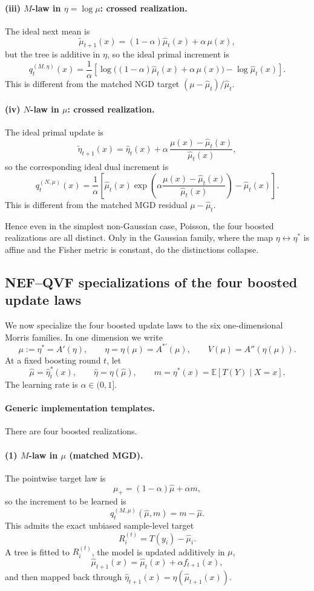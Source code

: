 \documentclass[11pt]{article}
\begin{document}
\paragraph{(iii) \(M\)-law in \(\eta=\log\mu\): crossed realization.}
The ideal next mean is
\[
\tilde\mu_{t+1}(x)=(1-\alpha)\hat\mu_t(x)+\alpha\,\mu(x),
\]
but the tree is additive in \(\eta\), so the ideal primal increment is
\[
q_t^{(M,\eta)}(x)
=
\frac{1}{\alpha}
\left[
\log\big((1-\alpha)\hat\mu_t(x)+\alpha\,\mu(x)\big)-\log \hat\mu_t(x)
\right].
\]
This is different from the matched NGD target \((\mu-\hat\mu_t)/\hat\mu_t\).

\paragraph{(iv) \(N\)-law in \(\mu\): crossed realization.}
The ideal primal update is
\[
\tilde\eta_{t+1}(x)
=
\hat\eta_t(x)+\alpha\,\frac{\mu(x)-\hat\mu_t(x)}{\hat\mu_t(x)},
\]
so the corresponding ideal dual increment is
\[
q_t^{(N,\mu)}(x)
=
\frac{1}{\alpha}
\left[
\hat\mu_t(x)\exp\!\left(
\alpha\frac{\mu(x)-\hat\mu_t(x)}{\hat\mu_t(x)}
\right)
-
\hat\mu_t(x)
\right].
\]
This is different from the matched MGD residual \(\mu-\hat\mu_t\).

Hence even in the simplest non-Gaussian case, Poisson, the four boosted realizations are all distinct. Only in the Gaussian family, where the map \(\eta\leftrightarrow\eta^\ast\) is affine and the Fisher metric is constant, do the distinctions collapse.

\subsection{NEF--QVF specializations of the four boosted update laws}

We now specialize the four boosted update laws to the six one-dimensional Morris families. In one dimension we write
\[
\mu:=\eta^\ast=A'(\eta),
\qquad
\eta=\eta(\mu)=A^{\ast\prime}(\mu),
\qquad
V(\mu)=A''(\eta(\mu)).
\]
At a fixed boosting round \(t\), let
\[
\hat\mu=\hat\eta_t^\ast(x),
\qquad
\hat\eta=\eta(\hat\mu),
\qquad
m=\eta^\ast(x)=\mathbb E[T(Y)\mid X=x].
\]
The learning rate is \(\alpha\in(0,1]\).

\paragraph{Generic implementation templates.}
There are four boosted realizations.

\paragraph{(1) \(M\)-law in \(\mu\) (matched MGD).}
The pointwise target law is
\[
\mu_{+}=(1-\alpha)\hat\mu+\alpha m,
\]
so the increment to be learned is
\[
q_t^{(M,\mu)}(\hat\mu,m)=m-\hat\mu.
\]
This admits the exact unbiased sample-level target
\[
R_i^{(t)}=T(y_i)-\hat\mu_i.
\]
A tree is fitted to \(R_i^{(t)}\), the model is updated additively in \(\mu\),
\[
\hat\mu_{t+1}(x)=\hat\mu_t(x)+\alpha f_{t+1}(x),
\]
and then mapped back through \(\hat\eta_{t+1}(x)=\eta(\hat\mu_{t+1}(x))\).
\end{document}
